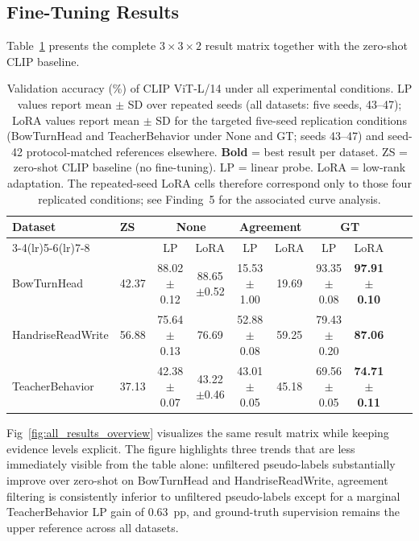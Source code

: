 \documentclass[10pt,letterpaper]{article}
\begin{document}
\subsection*{Fine-Tuning Results}
\label{sec:finetune_results}

Table~\ref{tab:main_results} presents the complete $3 \times 3 \times 2$
result matrix together with the zero-shot CLIP baseline.

\begin{table}[H]
\caption{Validation accuracy (\%) of CLIP ViT-L/14 under all
experimental conditions. LP values report mean $\pm$ SD over repeated
seeds (all datasets: five seeds, 43--47); LoRA values report mean $\pm$ SD for the targeted five-seed
replication conditions (BowTurnHead and TeacherBehavior under None and
GT; seeds 43--47) and seed-42 protocol-matched references elsewhere.
\textbf{Bold} = best result per dataset.
ZS = zero-shot CLIP baseline (no fine-tuning).
LP = linear probe. LoRA = low-rank adaptation.
The repeated-seed LoRA cells therefore correspond only to those four
replicated conditions; see Finding~5 for the associated curve
analysis.}
\label{tab:main_results}
\centering
\small
\begin{tabular}{llcccccccc}
\toprule
\multirow{2}{*}{\textbf{Dataset}} &
\multirow{2}{*}{\textbf{ZS}} &
\multicolumn{2}{c}{\textbf{None}} &
\multicolumn{2}{c}{\textbf{Agreement}} &
\multicolumn{2}{c}{\textbf{GT}} \\
\cmidrule(lr){3-4}\cmidrule(lr){5-6}\cmidrule(lr){7-8}
 & & LP & LoRA & LP & LoRA & LP & LoRA \\
\midrule
BowTurnHead
  & 42.37
  & 88.02$\pm$0.12 & 88.65$\pm$0.52
  & 15.53$\pm$1.00 & 19.69
  & 93.35$\pm$0.08 & \textbf{97.91$\pm$0.10} \\
HandriseReadWrite
  & 56.88
  & 75.64$\pm$0.13 & 76.69
  & 52.88$\pm$0.08 & 59.25
  & 79.43$\pm$0.20 & \textbf{87.06} \\
TeacherBehavior
  & 37.13
  & 42.38$\pm$0.07 & 43.22$\pm$0.46
  & 43.01$\pm$0.05 & 45.18
  & 69.56$\pm$0.05 & \textbf{74.71$\pm$0.11} \\
\bottomrule
\end{tabular}
\end{table}

Fig~\ref{fig:all_results_overview} visualizes the same result matrix
while keeping evidence levels explicit. The figure highlights
three trends that are less immediately visible from the table alone:
unfiltered pseudo-labels substantially improve over zero-shot on
BowTurnHead and HandriseReadWrite, agreement filtering is consistently
inferior to unfiltered pseudo-labels except for a marginal
TeacherBehavior LP gain of 0.63~pp, and ground-truth supervision
remains the upper reference across all datasets.
\end{document}
